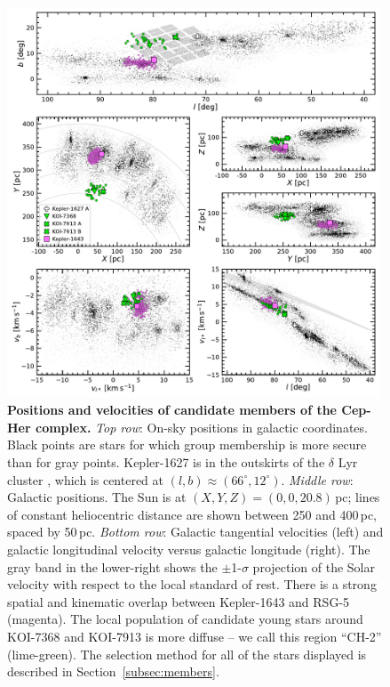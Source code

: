 \documentclass[12pt,twocolumn]{aastex63}
\begin{document}
\begin{figure}[t]
	\begin{center}
		\leavevmode
		\includegraphics[width=0.99\textwidth]{f1.pdf}
	\end{center}
	\vspace{-0.7cm}
	\caption{
  {\bf Positions and velocities of candidate members of the Cep-Her
  complex.}
  {\it Top row}: On-sky positions in galactic coordinates.  Black
  points are stars for which group membership is more secure than for
  gray points.  Kepler-1627 is in the outskirts of the $\delta$ Lyr
  cluster \citep{bouma_kep1627_2022}, which is centered at $(l,b)
  \approx (66^\circ, 12^\circ)$.
  {\it Middle row}: Galactic positions.  The Sun is at $(X, Y, Z) =
  (0, 0, 20.8)$\,pc; lines of constant heliocentric distance are
  shown between 250 and 400\,pc, spaced by 50\,pc.
  {\it Bottom row}: Galactic tangential velocities (left) and
  galactic longitudinal velocity versus galactic longitude (right).
  The gray band in the lower-right shows the $\pm$1-$\sigma$
  projection of the Solar velocity with respect to the local standard
  of rest.  There is a strong spatial and kinematic overlap between
  Kepler-1643 and RSG-5 (magenta).  The local population
  of candidate young stars around KOI-7368 and KOI-7913 is more
  diffuse -- we call this region ``CH-2'' (lime-green).
  The selection method for all of the stars displayed
  is described in Section~\ref{subsec:members}.
	\label{fig:XYZvtang}
	}
\end{figure}
\end{document}

